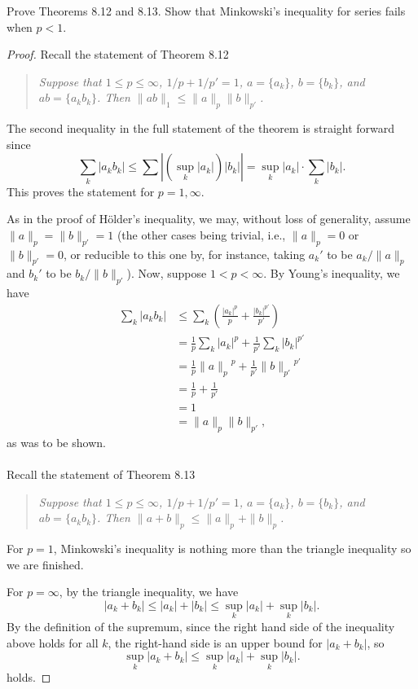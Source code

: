 \begin{problem}
Prove Theorems 8.12 and 8.13. Show that Minkowski’s inequality for series
fails when $p<1$.
\end{problem}
\begin{proof}
Recall the statement of Theorem 8.12
\begin{quote}
\emph{Suppose that $1\leq p\leq\infty$, $1/p+1/p'=1$, $a=\{a_k\}$, $b=\{b_k\}$,
and $ab=\{a_kb_k\}$. Then $\|ab\|_1\leq\|a\|_p\|b\|_{p'}$.}
\end{quote}
The second inequality in the full statement of the theorem is straight
forward since
\[
\sum_k|a_kb_k|\leq\sum\left|(\sup_k|a_k|)|b_k|\right|=\sup_k|a_k|\cdot \sum_k|b_k|.
\]
This proves the statement for $p=1,\infty$.

As in the proof of Hölder's inequality, we may, without loss of generality,
assume $\|a\|_p=\|b\|_{p'}=1$ (the other cases being trivial, i.e.,
$\|a\|_p=0$ or $\|b\|_{p'}=0$, or reducible to this one by, for instance,
taking $a_k'$ to be $a_k/\|a\|_p$ and $b_k'$ to be $b_k/\|b\|_{p'}$). Now,
suppose $1<p<\infty$. By Young's inequality, we have
\begin{align*}
\sum_k|a_kb_k|
&\leq\sum_k\left(\frac{{|a_k|}^p}{p}+\frac{{|b_k|}^{p'}}{p'}\right)\\
&=\frac{1}{p}\sum_k|a_k|^p+\frac{1}{p'}\sum_k|b_k|^{p'}\\
&=\frac{1}{p}{\|a\|_p}^p+\frac{1}{p'}{\|b\|_{p'}}^{p'}\\
&=\frac{1}{p}+\frac{1}{p'}\\
&=1\\
&=\|a\|_p\|b\|_{p'},
\end{align*}
as was to be shown.
\\\\
Recall the statement of Theorem 8.13
\begin{quote}
\emph{Suppose that $1\leq p\leq\infty$, $1/p+1/p'=1$, $a=\{a_k\}$, $b=\{b_k\}$,
and $ab=\{a_kb_k\}$. Then $\|a+b\|_p\leq\|a\|_p+\|b\|_p$.}
\end{quote}

For $p=1$, Minkowski's inequality is nothing more than the triangle
inequality so we are finished.

For $p=\infty$, by the triangle inequality, we have
\[
|a_k+b_k|\leq |a_k|+|b_k|\leq\sup_k|a_k|+\sup_k|b_k|.
\]
By the definition of the supremum, since the right hand side of the
inequality above holds for all $k$, the right-hand side is an upper bound
for $|a_k+b_k|$, so
\[
\sup_k|a_k+b_k|\leq\sup_k|a_k|+\sup_k|b_k|.
\]
holds.


\end{proof}
